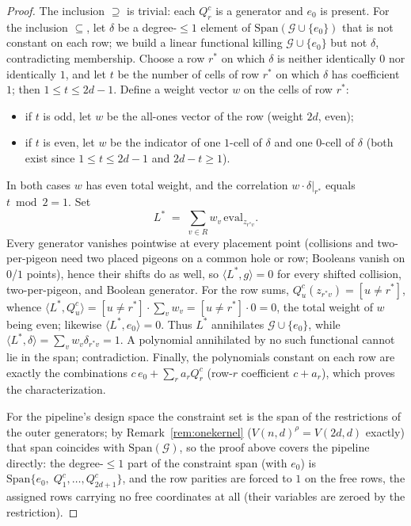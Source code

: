 \documentclass[11pt]{article}
\theoremstyle{definition}
\theoremstyle{remark}
\newcommand{\Sp}{\mathrm{Span}}
\begin{document}
\begin{proof}
The inclusion $\supseteq$ is trivial: each $Q^c_r$ is a generator and
$e_0$ is present.  For the inclusion $\subseteq$, let $\delta$ be a
degree-$\le1$ element of $\Sp(\mathcal{G}\cup\{e_0\})$ that is not
constant on each row; we build a linear functional killing
$\mathcal{G}\cup\{e_0\}$ but not $\delta$, contradicting membership.
Choose a row $r^\ast$ on which $\delta$ is neither identically $0$ nor
identically $1$, and let $t$ be the number of cells of row $r^\ast$ on
which $\delta$ has coefficient $1$; then $1\le t\le 2d-1$.  Define a
weight vector $w$ on the cells of row $r^\ast$:
\begin{itemize}
\item if $t$ is odd, let $w$ be the all-ones vector of the row (weight
$2d$, even);
\item if $t$ is even, let $w$ be the indicator of one $1$-cell of
$\delta$ and one $0$-cell of $\delta$ (both exist since
$1\le t\le 2d-1$ and $2d-t\ge1$).
\end{itemize}
In both cases $w$ has even total weight, and the correlation
$w\cdot\delta|_{r^\ast}$ equals $t\bmod 2=1$.  Set
\[
L^{*}\;=\;\sum_{v\in R} w_{v}\,\mathrm{eval}_{z_{r^\ast v}} .
\]
Every generator vanishes pointwise at every placement point (collisions
and two-per-pigeon need two placed pigeons on a common hole or row;
Booleans vanish on $0$/$1$ points), hence their shifts do as well, so
$\langle L^{*},g\rangle=0$ for every shifted collision, two-per-pigeon,
and Boolean generator.  For the row sums,
$Q^{c}_u(z_{r^\ast v})=[u\neq r^\ast]$, whence
$\langle L^{*},Q^c_u\rangle=[u\neq r^\ast]\cdot\sum_v w_v
=[u\neq r^\ast]\cdot 0=0$, the total weight of $w$ being even; likewise
$\langle L^{*},e_0\rangle=0$.  Thus $L^{*}$ annihilates
$\mathcal{G}\cup\{e_0\}$, while
$\langle L^{*},\delta\rangle=\sum_v w_v\delta_{r^\ast v}=1$.  A
polynomial annihilated by no such functional cannot lie in the span;
contradiction.  Finally, the polynomials constant on each row are exactly
the combinations $c\,e_0+\sum_r a_r Q^c_r$ (row-$r$ coefficient
$c+a_r$), which proves the characterization.

For the pipeline's design space the constraint set is the span of the
restrictions of the outer generators; by Remark~\ref{rem:onekernel}
($V(n,d)^{\rho}=V(2d,d)$ exactly) that span coincides with
$\Sp(\mathcal{G})$, so the proof above covers the pipeline directly:
the degree-$\le1$ part of the constraint span (with $e_0$) is
$\Sp\{e_0,\;Q^{c}_1,\dots,Q^{c}_{2d+1}\}$, and the row parities are
forced to $1$ on the free rows, the assigned rows carrying no free
coordinates at all (their variables are zeroed by the restriction).
\end{proof}
\end{document}
